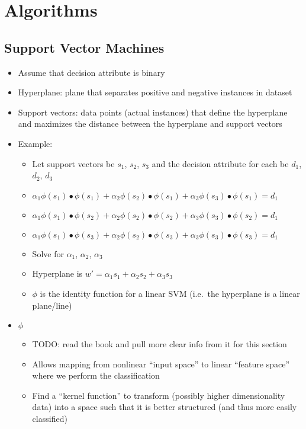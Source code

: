 \documentclass{article}
\begin{document}
\section{Algorithms}

\subsection{Support Vector Machines}
\begin{itemize}
	\item Assume that decision attribute is binary
	\item Hyperplane: plane that separates positive and negative instances in dataset
	\item Support vectors: data points (actual instances) that define the hyperplane and maximizes the distance between the hyperplane and support vectors
	\item Example:
		\begin{itemize}
			\item Let support vectors be $s_1$, $s_2$, $s_3$ and the decision attribute for each be $d_1$, $d_2$, $d_3$
			\item $\alpha_1 \phi(s_1) \bullet \phi(s_1) + \alpha_2 \phi(s_2) \bullet \phi(s_1) + \alpha_3 \phi(s_3) \bullet \phi(s_1) = d_1$
			\item $\alpha_1 \phi(s_1) \bullet \phi(s_2) + \alpha_2 \phi(s_2) \bullet \phi(s_2) + \alpha_3 \phi(s_3) \bullet \phi(s_2) = d_1$
			\item $\alpha_1 \phi(s_1) \bullet \phi(s_3) + \alpha_2 \phi(s_2) \bullet \phi(s_3) + \alpha_3 \phi(s_3) \bullet \phi(s_3) = d_1$
			\item Solve for $\alpha_1$, $\alpha_2$, $\alpha_3$
			\item Hyperplane is $w' = \alpha_1 s_1 + \alpha_2 s_2 + \alpha_3 s_3$
			\item $\phi$ is the identity function for a linear SVM (i.e.\ the hyperplane is a linear plane/line)
		\end{itemize}
	\item $\phi$
		\begin {itemize}
		  \item TODO: read the book and pull more clear info from it for this section
			\item Allows mapping from nonlinear ``input space'' to linear ``feature space'' where we perform the classification
			\item Find a ``kernel function'' to transform (possibly higher dimensionality data) into a space such that it is better structured (and thus more easily classified)

\end{itemize}
\end{itemize}
\end{document}
